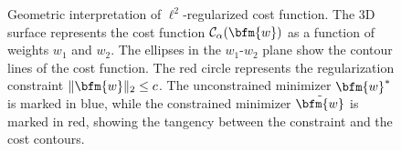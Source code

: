 \begin{figure}[t]
\centering

\caption{Geometric interpretation of $\ell^2$-regularized cost function.
    The 3D surface represents the cost function $\mathcal{C}_\alpha(\bfm{w})$ as a function of weights $w_1$ and $w_2$.
    The ellipses in the $w_1$-$w_2$ plane show the contour lines of the cost function.
    The red circle represents the regularization constraint $\|\bfm{w}\|_2 \leq c$.
    The unconstrained minimizer $\bfm{w}^*$ is marked in blue, while the constrained minimizer $\tilde{\bfm{w}}$ is marked in red, showing the tangency between the constraint and the cost contours.}\label{regularized.cost.optimization.fig}
\end{figure}

